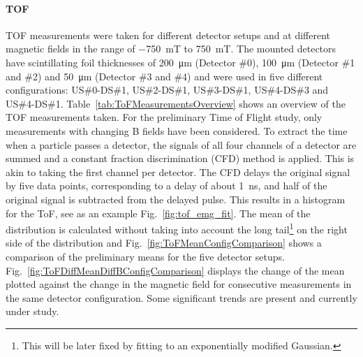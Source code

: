 \begin{refsection}
        \paragraph{TOF}
        TOF measurements were taken for different detector setups and at different magnetic fields in the range of \SI{-750}{mT} to \SI{+750}{mT}. 
        The mounted detectors have scintillating foil thicknesses of \SI{200}{\micro\meter} (Detector \#0), \SI{100}{\micro\meter} (Detector \#1 and \#2) and \SI{50}{\micro\meter} (Detector \#3 and \#4) and were used in five different configurations: US\#0-DS\#1, US\#2-DS\#1, US\#3-DS\#1, US\#4-DS\#3 and US\#4-DS\#1. Table~\ref{tab:ToFMeasurementsOverview} shows an overview of the TOF measurements taken. 
        For the preliminary Time of Flight study, only measurements with changing B fields have been considered.
        To extract the time when a particle passes a detector, the signals of all four channels of a detector are summed and a constant fraction discrimination (CFD) method is applied. 
        This is akin to taking the first channel per detector.
        The CFD delays the original signal by five data points, corresponding to a delay of about \SI{1}{ns}, and half of the original signal is subtracted from the delayed pulse. 
        This results in a histogram for the ToF, see as an example Fig.~\ref{fig:tof_emg_fit}.
        The mean of the distribution is calculated without taking into account the long tail\footnote{This will be later fixed by fitting to an exponentially modified Gaussian.} on the right side of the distribution and Fig.~\ref{fig:ToFMeanConfigComparison} shows a comparison of the preliminary means for the five detector setups.
        Fig.~\ref{fig:ToFDiffMeanDiffBConfigComparison} displays the change of the mean plotted against the change in the magnetic field for consecutive measurements in the same detector configuration. 
        Some significant trends are present and currently under study. 


\end{refsection}
